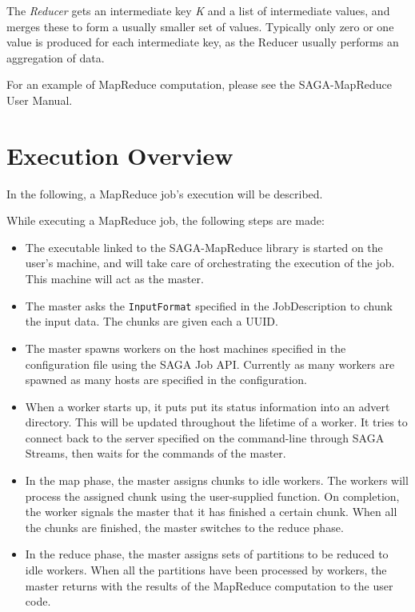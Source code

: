 \documentclass{article}
\begin{document}
The \emph{Reducer} gets an intermediate key \emph{K} and a list of intermediate values, and merges these to form a usually smaller set of values. Typically only zero or one value is produced for each intermediate key, as the Reducer usually performs an aggregation of data.

For an example of MapReduce computation, please see the SAGA-MapReduce User Manual.

\section{Execution Overview}

In the following, a MapReduce job's execution will be described.

While executing a MapReduce job, the following steps are made:
\begin{itemize}
  \item The executable linked to the SAGA-MapReduce library is started on the user's machine, and will take care of orchestrating the execution of the job. This machine will act as the master.
  \item The master asks the \texttt{InputFormat} specified in the JobDescription to chunk the input data. The chunks are given each a UUID.
  \item The master spawns workers on the host machines specified in the configuration file using the SAGA Job API. Currently as many workers are spawned as many hosts are specified in the configuration.
  \item When a worker starts up, it puts put its status information into an advert directory. This will be updated throughout the lifetime of a worker. It tries to connect back to the server specified on the command-line through SAGA Streams, then waits for the commands of the master.
  \item In the map phase, the master assigns chunks to idle workers. The workers will process the assigned chunk using the user-supplied function. On completion, the worker signals the master that it has finished a certain chunk. When all the chunks are finished, the master switches to the reduce phase.
  \item In the reduce phase, the master assigns sets of partitions to be reduced to idle workers. When all the partitions have been processed by workers, the master returns with the results of the MapReduce computation to the user code.
\end{itemize}
\end{document}
